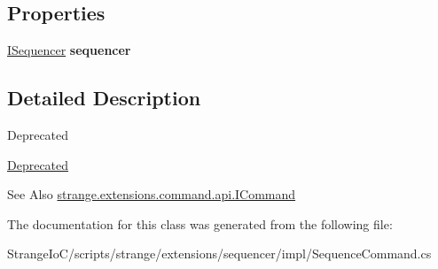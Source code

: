 \subsection*{Properties}
\begin{DoxyCompactItemize}
\item 
\hypertarget{classstrange_1_1extensions_1_1sequencer_1_1impl_1_1_sequence_command_a5d1248ae0b796af73a45eefa66bced14}{\hyperlink{interfacestrange_1_1extensions_1_1sequencer_1_1api_1_1_i_sequencer}{I\-Sequencer} {\bfseries sequencer}}\label{classstrange_1_1extensions_1_1sequencer_1_1impl_1_1_sequence_command_a5d1248ae0b796af73a45eefa66bced14}

\end{DoxyCompactItemize}


\subsection{Detailed Description}
\begin{DoxyRefDesc}{Deprecated}
\item[\hyperlink{deprecated__deprecated000007}{Deprecated}]\end{DoxyRefDesc}


\begin{DoxySeeAlso}{See Also}
\hyperlink{interfacestrange_1_1extensions_1_1command_1_1api_1_1_i_command}{strange.\-extensions.\-command.\-api.\-I\-Command} 
\end{DoxySeeAlso}


The documentation for this class was generated from the following file\-:\begin{DoxyCompactItemize}
\item 
Strange\-Io\-C/scripts/strange/extensions/sequencer/impl/Sequence\-Command.\-cs\end{DoxyCompactItemize}
